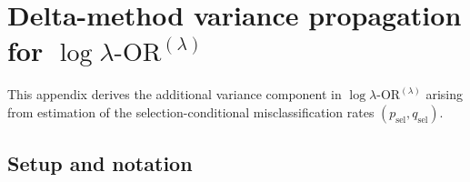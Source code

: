\documentclass[pdflatex,sn-mathphys-num]{sn-jnl}%
\newcommand{\SPOR}{\textrm{$\lambda$-OR}}
\newcommand{\logor}{\log\SPOR}
\theoremstyle{thmstyleone}%
\theoremstyle{thmstyletwo}%
\theoremstyle{thmstylethree}%
\begin{document}







\appendix
\renewcommand{\thesection}{Appendix \arabic{section}.}
\setcounter{section}{0}
\section{Delta-method variance propagation for $\logor^{(\lambda)}$}\label{app:variance}

This appendix derives the additional variance component in $\logor^{(\lambda)}$ arising from estimation of the
selection-conditional misclassification rates $(p_{\mathrm{sel}},q_{\mathrm{sel}})$.

\subsection*{Setup and notation}
\end{document}
